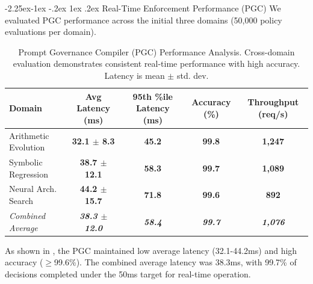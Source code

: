 \documentclass[manuscript,screen,9pt]{acmart}
\makeatletter
\renewcommand\subsection{\@startsection{subsection}{2}{\z@}%
  {-2.25ex\@plus -1ex \@minus -.2ex}%
  {1ex \@plus .2ex}%
  {\normalfont\large\bfseries}}
\newcommand{\tablesize}{\footnotesize}
\newcommand{\tablenumfmt}[1]{\textbf{#1}}
\newcommand{\tableheader}[1]{\textbf{#1}}
\makeatother
\begin{document}
\subsection{Real-Time Enforcement Performance (PGC)}
\label{subsec:pgc_performance}
We evaluated PGC performance across the initial three domains (50,000 policy evaluations per domain).

\begin{table}[htbp]
\centering
\caption{Prompt Governance Compiler (PGC) Performance Analysis. Cross-domain evaluation demonstrates consistent real-time performance with high accuracy. Latency is mean $\pm$ std. dev.}
\label{tab:pgc_comprehensive}
\tablesize
\begin{tabular}{@{}lcccc@{}}
\toprule
\tableheader{Domain} & \tableheader{Avg Latency (ms)} & \tableheader{95th \%ile Latency (ms)} & \tableheader{Accuracy (\%)} & \tableheader{Throughput (req/s)} \\
\midrule
Arithmetic Evolution & \tablenumfmt{32.1 $\pm$ 8.3}   & \tablenumfmt{45.2}  & \tablenumfmt{99.8} & \tablenumfmt{1,247} \\
Symbolic Regression  & \tablenumfmt{38.7 $\pm$ 12.1}  & \tablenumfmt{58.3}  & \tablenumfmt{99.7} & \tablenumfmt{1,089} \\
Neural Arch. Search & \tablenumfmt{44.2 $\pm$ 15.7}  & \tablenumfmt{71.8}  & \tablenumfmt{99.6} & \tablenumfmt{892}   \\
\midrule
\textit{Combined Average} & \textit{\tablenumfmt{38.3 $\pm$ 12.0}} & \textit{\tablenumfmt{58.4}} & \textit{\tablenumfmt{99.7}} & \textit{\tablenumfmt{1,076}} \\
\bottomrule
\end{tabular}
\end{table}

As shown in , the PGC maintained low average latency (32.1-44.2ms) and high accuracy ($\geq$99.6\%). The combined average latency was 38.3ms, with 99.7\% of decisions completed under the 50ms target for real-time operation.
\end{document}
